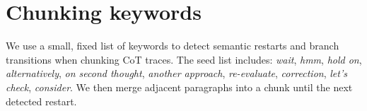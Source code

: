 \documentclass{article}
\begin{document}
\appendix
\section{Chunking keywords}
\label{app:keywords}
We use a small, fixed list of keywords to detect semantic restarts and branch transitions when chunking CoT traces. The seed list includes: \textit{wait}, \textit{hmm}, \textit{hold on}, \textit{alternatively}, \textit{on second thought}, \textit{another approach}, \textit{re-evaluate}, \textit{correction}, \textit{let’s check}, \textit{consider}. We then merge adjacent paragraphs into a chunk until the next detected restart.



\end{document}

